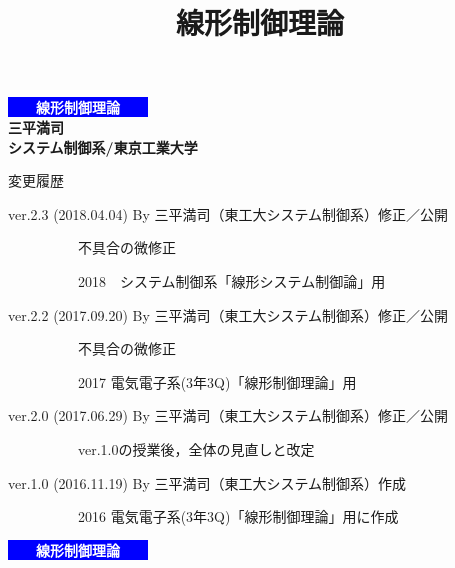 \documentclass[dvipdfmx,cjk,10pt]{beamer}	%
\title[線形制御理論]
{\LARGE{線形制御理論}}
\author[Sampei (Tokyo Tech.) ver.2.3]{}  %
\institute[]{}
\date{}
\begin{document}

\begin{frame}[t] 



\begin{center}
\Huge \bf
\colorbox{blue}{\textcolor{white}{　　線形制御理論　　}}\\[5mm]
\Large
  三平満司\\
  システム制御系/東京工業大学
\end{center}

\hspace*{0.25\textwidth}
\begin{minipage}{0.7\textwidth}
{\footnotesize
変更履歴 %

ver.2.3 (2018.04.04) By 三平満司（東工大システム制御系）修正／公開

　　　　　不具合の微修正

　　　　　2018　システム制御系「線形システム制御論」用

ver.2.2 (2017.09.20) By 三平満司（東工大システム制御系）修正／公開

　　　　　不具合の微修正

　　　　　2017  電気電子系(3年3Q)「線形制御理論」用

ver.2.0 (2017.06.29) By 三平満司（東工大システム制御系）修正／公開

　　　　　ver.1.0の授業後，全体の見直しと改定

ver.1.0 (2016.11.19) By 三平満司（東工大システム制御系）作成

　　　　　2016 電気電子系(3年3Q)「線形制御理論」用に作成
}
\end{minipage}

\end{frame}

\begin{frame}[t] 


\begin{center}
\Huge \bf
\colorbox{blue}{\textcolor{white}{　　線形制御理論　　}}
\end{center}

\end{frame}
\end{document}

